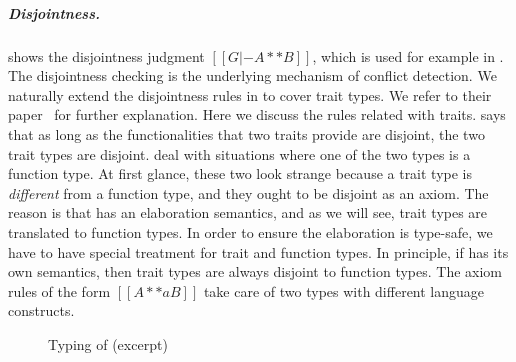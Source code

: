 \subparagraph{Disjointness.}
 shows the disjointness judgment $[[G |- A ** B]]$, which is
used for example in . The disjointness checking is the underlying
mechanism of conflict detection. We naturally extend the disjointness rules in
\bname to cover trait types. We refer to
their paper~\cite{alpuimdisjoint} for further explanation. Here we discuss
the rules
related with traits.  says that as long as the functionalities
that two traits provide are disjoint, the two trait types are disjoint.
 deal with situations where one of the two types
is a function type. At first glance, these two look strange because a trait type is
\textit{different} from a function type, and they ought to be disjoint as an axiom. The reason
is that \name has an elaboration semantics, and as we will see, trait types are translated to function
types. In order to ensure the elaboration is type-safe, we have to have special treatment for trait
and function types. In principle, if \name has its own semantics, then trait types are always disjoint
to function types. The axiom rules of the form $[[ A **a B ]]$ take care of two types with different language constructs.

\renewcommand\ottaltinferrule[4]{
  \inferrule*[narrower=0.9,right=#1,#2]
    {#3}
    {#4}
}

\renewcommand{\rulehl}[1]{}

\begin{figure}[t]
  \centering
  \begin{small}
  \end{small}
  \caption{Typing of \name (excerpt)}
  \label{fig:type}
\end{figure}

